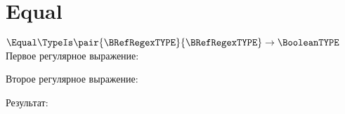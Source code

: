 \section{Equal}
\begin{frame}{$\Equal\TypeIs\pair{\BRefRegexTYPE}{\BRefRegexTYPE}\to\BooleanTYPE$}
	Первое регулярное выражение:

	Второе регулярное выражение:

	Результат:

\end{frame}